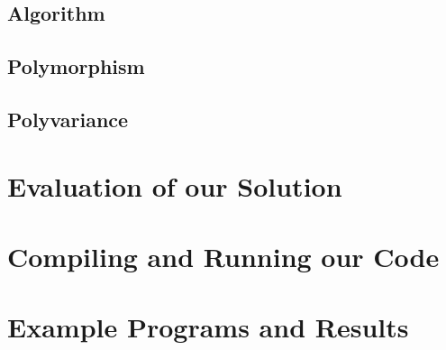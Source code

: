 \documentclass[a4paper,11pt]{article}
\begin{document}
\subsection{Algorithm}
\subsection{Polymorphism}
\subsection{Polyvariance}


\section{Evaluation of our Solution}


\section{Compiling and Running our Code}


\section{Example Programs and Results}
\end{document}
